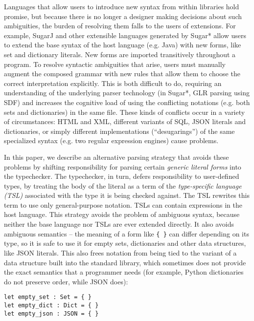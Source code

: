 Languages that allow users to introduce new syntax from within libraries hold promise, but because there is no longer a designer making decisions about such ambiguities, the burden of resolving them falls to the users of extensions. For example, SugarJ \cite{Erdweg:2011:SLL:2048147.2048199} and other extensible languages generated by Sugar* \cite{Erdweg:2013:FEL:2517208.2517210} allow users to extend the base syntax of the host language (e.g. Java) with new forms, like set and dictionary literals. New forms are imported transitively throughout a program. To resolve syntactic ambiguities that arise, users must manually augment the composed grammar with new rules that allow them to choose the correct interpretation explicitly. This is both difficult to do, requiring an understanding of the underlying parser technology (in Sugar*, GLR parsing using SDF) and increases the cognitive load of using the conflicting notations (e.g. both sets and dictionaries) in the same file. These kinds of conflicts occur in a variety of circumstances: HTML and XML, different variants of SQL, JSON literals and dictionaries, or simply different implementations (``desugarings'') of the same specialized syntax (e.g. two regular expression engines) cause problems.

In this paper, we describe an alternative parsing strategy that avoids these problems by shifting responsibility for parsing certain \emph{generic literal forms} into the typechecker. The typechecker, in turn, defers responsibility to user-defined types, by treating the body of the literal as a term of the   \emph{type-specific language (TSL)} associated with the type it is being checked against. The TSL rewrites this term to use only general-purpose notation. TSLs can contain expressions in the host language. This strategy avoids the problem of ambiguous syntax, because neither the base language nor TSLs are ever extended directly. It also avoids ambiguous semantics -- the meaning of a form like \verb|{ }| can differ depending  on its type, so it is safe to use it for empty sets, dictionaries and other data structures, like JSON literals. This also frees notation from being tied to the variant of a  data structure built into the standard library, which sometimes does not provide the exact semantics that a programmer needs (for example, Python dictionaries do not preserve order, while JSON does):
\begin{lstlisting}
let empty_set : Set = { }
let empty_dict : Dict = { }
let empty_json : JSON = { }
\end{lstlisting}

